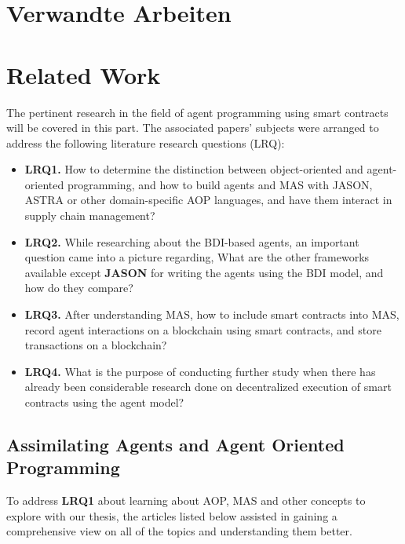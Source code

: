 {\chapter{Verwandte Arbeiten}}
{\chapter{Related Work}}
\label{sec:related}


The pertinent research in the field of agent programming using smart contracts will be covered in this part. The associated papers' subjects were arranged to address the following literature research questions (LRQ): 
\begin{itemize}[label={}]
    \item \textbf{LRQ1.} How to determine the distinction between object-oriented and agent-oriented programming, and how to build agents and \ac{MAS} with JASON, ASTRA or other domain-specific \ac{AOP} languages, and have them interact in supply chain management?\\

    \item \textbf{LRQ2.} While researching about the \ac{BDI}-based agents, an important question came into a picture regarding, What are the other frameworks available except \textbf{JASON} for writing the agents using the \ac{BDI} model, and how do they compare?\\
    
    \item \textbf{LRQ3.} After understanding \ac{MAS}, how to include smart contracts into \ac{MAS}, record agent interactions on a blockchain using smart contracts, and store transactions on a blockchain?\\

    \item \textbf{LRQ4.} What is the purpose of conducting further study when there has already been considerable research done on decentralized execution of smart contracts using the agent model?

\end{itemize}

\section{Assimilating Agents and Agent Oriented Programming}

To address \textbf{LRQ1} about learning about \ac{AOP}, \ac{MAS} and other concepts to explore with our thesis, the articles listed below assisted in gaining a comprehensive view on all of the topics and understanding them better.

